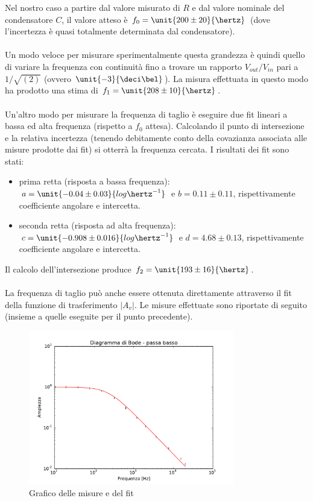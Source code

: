 \documentclass[10pt,a4paper]{article}
\begin{document}
Nel nostro caso a partire dal valore misurato di $R$ e dal valore nominale del condensatore $C$, il valore atteso è $f_0 = \unit{200 \pm 20}{\hertz}$ (dove l'incertezza è quasi totalmente determinata dal condensatore).
\\\\
Un modo veloce per misurare sperimentalmente questa grandezza è quindi quello di variare la frequenza con continuità fino a trovare  un rapporto $V_{out}/V_{in}$ pari a $1/\sqrt{(2)}$ (ovvero $\unit{-3}{\deci\bel}$). La misura effettuata in questo modo ha prodotto una stima di $f_1 =\unit{208 \pm 10}{\hertz}$.
\\\\
Un'altro modo per misurare la frequenza di taglio è eseguire due fit lineari a bassa ed alta frequenza (rispetto a $f_0$ attesa). Calcolando il punto di intersezione e la relativa incertezza (tenendo debitamente conto della covazianza associata alle misure prodotte dai fit) si otterrà la frequenza cercata. I risultati dei fit sono stati: 
\begin{itemize}
	\item prima retta (risposta a bassa frequenza):	 $a=\unit{-0.04 \pm 0.03}{log{\hertz^{-1}}}$ e	 $b=0.11 \pm 0.11$, rispettivamente coefficiente angolare e intercetta.
	\item seconda retta (risposta ad alta frequenza):	 $c=\unit{-0.908 \pm 0.016}{log{\hertz^{-1}}}$ e	 $d=4.68\pm 0.13$, rispettivamente coefficiente angolare e intercetta.
\end{itemize}
Il calcolo dell'intersezione produce $f_2 =\unit{ 193 \pm 16}{\hertz}$.
\\\\
La frequenza di taglio può anche essere ottenuta direttamente attraverso il fit della funzione di trasferimento $|A_v|$. Le misure effettuate sono riportate di seguito (insieme a quelle eseguite per il punto precedente).

\begin{figure}[h!]
	\centering
		
\end{figure}
\begin{figure}[h]
		\centering
		\includegraphics[width=0.8\textwidth]{../grafici/fit_Bode_Lowpass_800ohm.pdf}
		\caption{Grafico delle misure e del fit}
\end{figure}
\end{document}
